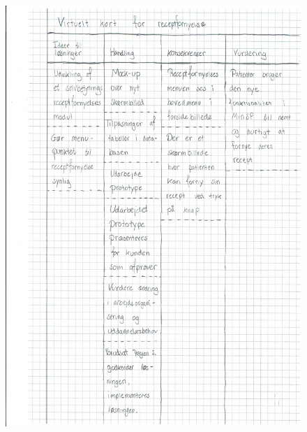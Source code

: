 \begin{figure}[H]
	\centering
	\includegraphics[angle=0, height=1.05\textheight]{Materials/DV_Kort2.pdf}
	\label{fig:DVkort2}
\end{figure}
